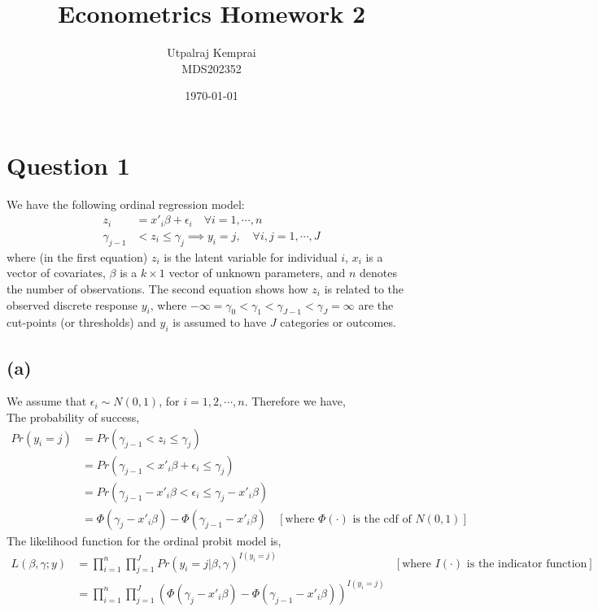\documentclass[a4paper]{article}
\begin{document}
\title{Econometrics Homework 2}
\author{Utpalraj Kemprai \\
MDS202352}
\date{\today}

\maketitle

\newpage

\section*{Question 1}

We have the following ordinal regression model:
\begin{align*}
    z_{i} &= x'_{i}\beta + \epsilon_{i} \quad \forall i = 1,\cdots,n \\
    \gamma_{j-1} &< z_{i} \leq \gamma_{j} \implies y_{i} = j, \quad \forall i, j = 1, \cdots, J
\end{align*}
where (in the first equation) $z_i$ is the latent variable for individual $i$, $x_i$ is a  vector of covariates,
$\beta$ is a $k\times1$ vector of unknown parameters, and $n$ denotes the number of observations. The second equation shows how $z_i$ is related to the observed discrete response $y_i$, where $-\infty = \gamma_0 < \gamma_1 <
\gamma_{J-1} < \gamma_J = \infty$ are the cut-points (or thresholds) and $y_i$ is assumed to have $J$ categories or outcomes.

\subsection*{(a)}

We assume that $\epsilon_i \sim N(0,1)$, for $i = 1,2,\cdots, n$. Therefore we have,\\
The probability of success,
\begin{align*}
    Pr(y_i = j) &= Pr(\gamma_{j-1} < z_{i} \leq \gamma_j)\\
                &= Pr(\gamma_{j-1} < x'_{i}\beta + \epsilon_{i} \leq \gamma_j) \\
                &= Pr(\gamma_{j-1} - x'_{i}\beta < \epsilon_{i} \leq \gamma_j - x'_{i}\beta)\\
                &= \Phi(\gamma_j - x'_{i}\beta) - \Phi(\gamma_{j-1} - x'_{i}\beta) &[\text{where } \Phi(\cdot) \text{ is the cdf of }N(0,1) ]
\end{align*}
The likelihood function for the ordinal probit model is,
\begin{align*}
    L(\beta,\gamma;y) &= \prod_{i=1}^{n}\prod_{j=1}^{J} Pr(y_i = j | \beta,\gamma)^{I(y_i = j)} &[\text{where } I(\cdot) \text{ is the indicator function}]\\
                      &= \prod_{i=1}^{n}\prod_{j=1}^{J} (\Phi(\gamma_j - x'_{i}\beta) - \Phi(\gamma_{j-1} - x'_{i}\beta))^{I(y_i = j)}
\end{align*}
\end{document}
